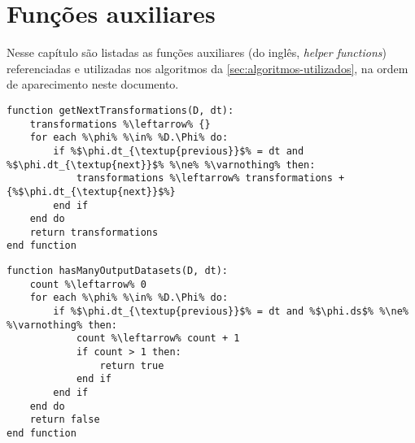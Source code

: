 
\chapter{Funções auxiliares}%
\label{app:funcoes-auxiliares}

Nesse capítulo são listadas as funções auxiliares (do inglês, \textit{helper functions}) referenciadas e utilizadas nos algoritmos da \autoref{sec:algoritmos-utilizados}, na ordem de aparecimento neste documento.

\vfill{}

\begin{minipage}[c]{0.95\textwidth}
\begin{lstlisting}[language=pseudocode,label={lst:get-next-transformations},caption={[Obtenção das próximas transformações de dados de uma transformação]Obtenção das próximas transformações de dados de uma transformação de dados.}]
function getNextTransformations(D, dt):
    transformations %\leftarrow% {}
    for each %\phi% %\in% %D.\Phi% do:
        if %$\phi.dt_{\textup{previous}}$% = dt and %$\phi.dt_{\textup{next}}$% %\ne% %\varnothing% then:
            transformations %\leftarrow% transformations + {%$\phi.dt_{\textup{next}}$%}
        end if
    end do
    return transformations
end function
\end{lstlisting}
\end{minipage}

\vfill{}

\begin{minipage}[c]{0.95\textwidth} \begin{lstlisting}[language=pseudocode,label={lst:has-many-output-datasets},caption={[Contagem dos conjuntos de dados de saída de uma transformação]Contagem dos conjuntos de dados de saída de uma transformação de dados. Retorna verdadeiro caso essa quantidade seja maior do que 1, e falso caso contrário.}]
function hasManyOutputDatasets(D, dt):
    count %\leftarrow% 0
    for each %\phi% %\in% %D.\Phi% do:
        if %$\phi.dt_{\textup{previous}}$% = dt and %$\phi.ds$% %\ne% %\varnothing% then:
            count %\leftarrow% count + 1
            if count > 1 then:
                return true
            end if
        end if
    end do
    return false
end function
\end{lstlisting}
\end{minipage}

\vfill{}

